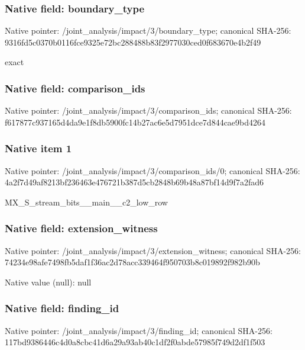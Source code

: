 \documentclass[10pt,a4paper]{article}
\begin{document}
\subsubsection{Native field: boundary\_\allowbreak{}type}
Native pointer: /joint\_\allowbreak{}analysis/impact/3/boundary\_\allowbreak{}type; canonical SHA-256: 9316fd5c0370b0116fce9325e72bc288488b83f2977030ced0f683670e4b2f49

\begingroup\raggedright\sloppy exact\par\endgroup

\subsubsection{Native field: comparison\_\allowbreak{}ids}
Native pointer: /joint\_\allowbreak{}analysis/impact/3/comparison\_\allowbreak{}ids; canonical SHA-256: f617877c937165d4da9e1f8db5900fc14b27ac6e5d7951dce7d844cae9bd4264

\subsubsection{Native item 1}
Native pointer: /joint\_\allowbreak{}analysis/impact/3/comparison\_\allowbreak{}ids/0; canonical SHA-256: 4a2f7d49af8213bf236463e476721b387d5cb2848b69b48a87bf14d9f7a2fad6

\begingroup\raggedright\sloppy MX\_\allowbreak{}S\_\allowbreak{}stream\_\allowbreak{}bits\_\allowbreak{}\_\allowbreak{}main\_\allowbreak{}\_\allowbreak{}c2\_\allowbreak{}low\_\allowbreak{}row\par\endgroup

\subsubsection{Native field: extension\_\allowbreak{}witness}
Native pointer: /joint\_\allowbreak{}analysis/impact/3/extension\_\allowbreak{}witness; canonical SHA-256: 74234e98afe7498fb5daf1f36ac2d78acc339464f950703b8c019892f982b90b

Native value (null): null

\subsubsection{Native field: finding\_\allowbreak{}id}
Native pointer: /joint\_\allowbreak{}analysis/impact/3/finding\_\allowbreak{}id; canonical SHA-256: 117bd9386446c4d0a8cbc41d6a29a93ab40c1df2f0abde57985f749d2df1f503
\end{document}
